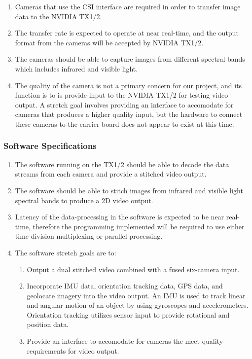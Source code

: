 \begin{enumerate}[label=\alph*]
	\item Cameras that use the CSI interface are required in order to transfer image data to 
	the NVIDIA TX1/2.\\
	\item The transfer rate is expected to operate at near real-time, and the output format 
	from the cameras will be accepted by NVIDIA TX1/2.\\
	\item The cameras should be able to capture images from different spectral bands 
	which includes infrared and visible light.\\
	\item The quality of the camera is not a primary concern for our project, and its 
	function is to is provide input to the NVIDIA TX1/2 for testing video output. 
	A stretch goal involves providing an interface to accomodate for cameras that 
	produces a higher quality input, but the hardware to connect these cameras to the 
	carrier board does not appear to exist at this time.\\
\end{enumerate}

\subsubsection{Software Specifications}

\begin{enumerate}[label=\alph*]
	\item The software running on the TX1/2 should be able to decode the data streams 
	from each camera and provide a stitched video output.\\
	\item The software should be able to stitch images from infrared 
	and visible light spectral bands to produce a 2D video output. \\
	\item Latency of the data-processing in the software is expected to be near 
	real-time, therefore the programming implemented will be required to use either time
	division multiplexing or parallel processing. \\
	\item The software stretch goals are to:
	\begin{enumerate}
	 	\item Output a dual stitched video combined with a fused six-camera input.\\
		\item Incorporate IMU data, orientation tracking data, GPS data, and geolocate 
		imagery into the video output. An IMU is used to track linear and angular 
		motion of an object by using gyroscopes and accelerometers. Orientation 
		tracking utilizes sensor input to provide rotational and position data.\\
		\item Provide an interface to accomodate for cameras the meet quality
		requirements for video output. \\
	\end{enumerate} 
\end{enumerate}

